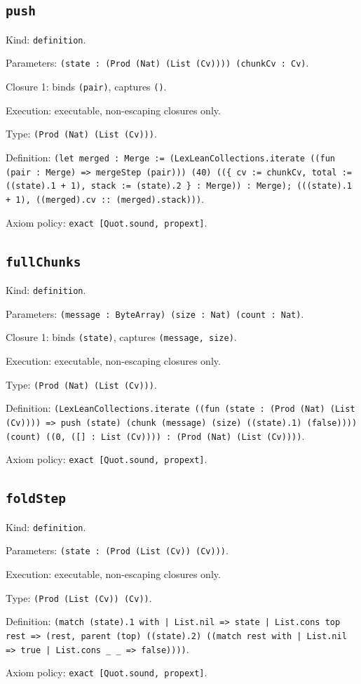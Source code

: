 \documentclass[11pt]{article}
\begin{document}
\subsection*{\texttt{push}}
\noindent Kind: \texttt{definition}.\par
\noindent Parameters: \texttt{(state : (Prod (Nat) (List (Cv)))) (chunkCv : Cv)}.\par
\noindent Closure 1: binds \texttt{(pair)}, captures \texttt{()}.\par
\noindent Execution: executable, non-escaping closures only.\par
\noindent Type: \texttt{(Prod (Nat) (List (Cv)))}.\par
\noindent Definition: \texttt{(let merged : Merge := (LexLeanCollections.iterate ((fun (pair : Merge) => mergeStep (pair))) (40) ((\{ cv := chunkCv, total := ((state).1 + 1), stack := (state).2 \} : Merge)) : Merge); (((state).1 + 1), ((merged).cv :: (merged).stack)))}.\par
\noindent Axiom policy: \texttt{exact [Quot.sound, propext]}.\par
\subsection*{\texttt{fullChunks}}
\noindent Kind: \texttt{definition}.\par
\noindent Parameters: \texttt{(message : ByteArray) (size : Nat) (count : Nat)}.\par
\noindent Closure 1: binds \texttt{(state)}, captures \texttt{(message, size)}.\par
\noindent Execution: executable, non-escaping closures only.\par
\noindent Type: \texttt{(Prod (Nat) (List (Cv)))}.\par
\noindent Definition: \texttt{(LexLeanCollections.iterate ((fun (state : (Prod (Nat) (List (Cv)))) => push (state) (chunk (message) (size) ((state).1) (false)))) (count) ((0, ([] : List (Cv)))) : (Prod (Nat) (List (Cv))))}.\par
\noindent Axiom policy: \texttt{exact [Quot.sound, propext]}.\par
\subsection*{\texttt{foldStep}}
\noindent Kind: \texttt{definition}.\par
\noindent Parameters: \texttt{(state : (Prod (List (Cv)) (Cv)))}.\par
\noindent Execution: executable, non-escaping closures only.\par
\noindent Type: \texttt{(Prod (List (Cv)) (Cv))}.\par
\noindent Definition: \texttt{(match (state).1 with | List.nil => state | List.cons top rest => (rest, parent (top) ((state).2) ((match rest with | List.nil => true | List.cons \_ \_ => false))))}.\par
\noindent Axiom policy: \texttt{exact [Quot.sound, propext]}.\par
\end{document}
